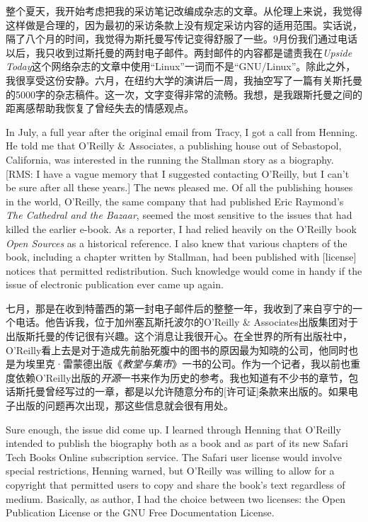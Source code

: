 \ifdefined\chs
整个夏天，我开始考虑把我的采访笔记改编成杂志的文章。从伦理上来说，我觉得这样做是合理的，因为最初的采访条款上没有规定采访内容的适用范围。实话说，隔了八个月的时间，我觉得为斯托曼写传记变得舒服了一些。9月份我们通过电话以后，我只收到过斯托曼的两封电子邮件。两封邮件的内容都是谴责我在\textit{Upside Today}这个网络杂志的文章中使用“Linux”一词而不是“GNU/Linux”。除此之外，我很享受这份安静。六月，在纽约大学的演讲后一周，我抽空写了一篇有关斯托曼的5000字的杂志稿件。这一次，文字变得非常的流畅。我想，是我跟斯托曼之间的距离感帮助我恢复了曾经失去的情感观点。
\fi

\ifdefined\eng
In July, a full year after the original email from Tracy, I got a call from Henning. He told me that O'Reilly \& Associates, a publishing house out of Sebastopol, California, was interested in the running the Stallman story as a biography. [RMS: I have a vague memory that I suggested contacting O'Reilly, but I can't be sure after all these years.] The news pleased me. Of all the publishing houses in the world, O'Reilly, the same company that had published Eric Raymond's \textit{The Cathedral and the Bazaar}, seemed the most sensitive to the issues that had killed the earlier e-book. As a reporter, I had relied heavily on the O'Reilly book \textit{Open Sources} as a historical reference. I also knew that various chapters of the book, including a chapter written by Stallman, had been published with [license] notices that permitted redistribution. Such knowledge would come in handy if the issue of electronic publication ever came up again.
\fi

\ifdefined\chs
七月，那是在收到特蕾西的第一封电子邮件后的整整一年，我收到了来自亨宁的一个电话。他告诉我，位于加州塞瓦斯托波尔的O'Reilly \& Associates出版集团对于出版斯托曼的传记很有兴趣。这个消息让我很开心。在全世界的所有出版社中，O'Reilly看上去是对于造成先前胎死腹中的图书的原因最为知晓的公司，他同时也是为埃里克·雷蒙德出版《\textit{教堂与集市}》一书的公司。作为一个记者，我以前也重度依赖O'Reilly出版的\textit{开源}一书来作为历史的参考。我也知道有不少书的章节，包话斯托曼曾经写过的一章，都是以允许随意分布的[许可证]条款来出版的。如果电子出版的问题再次出现，那这些信息就会很有用处。
\fi

\ifdefined\eng
Sure enough, the issue did come up. I learned through Henning that O'Reilly intended to publish the biography both as a book and as part of its new Safari Tech Books Online subscription service. The Safari user license would involve special restrictions, Henning warned, but O'Reilly was willing to allow for a copyright that permitted users to copy and share the book's text regardless of medium. Basically, as author, I had the choice between two licenses: the Open Publication License or the GNU Free Documentation License.
\fi

